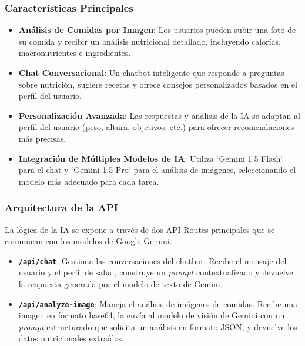 \documentclass[12pt,a4paper]{article}
\begin{document}
\subsubsection{Características Principales}
\begin{itemize}
    \item \textbf{Análisis de Comidas por Imagen}: Los usuarios pueden subir una foto de su comida y recibir un análisis nutricional detallado, incluyendo calorías, macronutrientes e ingredientes.
    \item \textbf{Chat Conversacional}: Un chatbot inteligente que responde a preguntas sobre nutrición, sugiere recetas y ofrece consejos personalizados basados en el perfil del usuario.
    \item \textbf{Personalización Avanzada}: Las respuestas y análisis de la IA se adaptan al perfil del usuario (peso, altura, objetivos, etc.) para ofrecer recomendaciones más precisas.
    \item \textbf{Integración de Múltiples Modelos de IA}: Utiliza `Gemini 1.5 Flash` para el chat y `Gemini 1.5 Pro` para el análisis de imágenes, seleccionando el modelo más adecuado para cada tarea.
\end{itemize}

\subsubsection{Arquitectura de la API}

La lógica de la IA se expone a través de dos API Routes principales que se comunican con los modelos de Google Gemini.

\begin{itemize}
    \item \textbf{\texttt{/api/chat}}: Gestiona las conversaciones del chatbot. Recibe el mensaje del usuario y el perfil de salud, construye un \textit{prompt} contextualizado y devuelve la respuesta generada por el modelo de texto de Gemini.
    
    \item \textbf{\texttt{/api/analyze-image}}: Maneja el análisis de imágenes de comidas. Recibe una imagen en formato base64, la envía al modelo de visión de Gemini con un \textit{prompt} estructurado que solicita un análisis en formato JSON, y devuelve los datos nutricionales extraídos.
\end{itemize}
\end{document}

